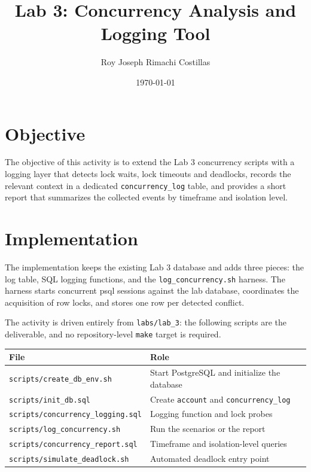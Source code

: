 \documentclass[11pt]{article}
\title{Lab 3\@: Concurrency Analysis and Logging Tool}
\author{Roy Joseph Rimachi Costillas}
\date{\today}
\begin{document}
\maketitle

\section{Objective}

The objective of this activity is to extend the Lab 3 concurrency scripts with a
logging layer that detects lock waits, lock timeouts and deadlocks, records the
relevant context in a dedicated \texttt{concurrency\_log} table, and provides a
short report that summarizes the collected events by timeframe and isolation
level.

\section{Implementation}

The implementation keeps the existing Lab 3 database and adds three pieces:
the log table, SQL logging functions, and the
\texttt{log\_concurrency.sh} harness. The harness starts concurrent psql
sessions against the lab database, coordinates the acquisition of row locks,
and stores one row per detected conflict.

The activity is driven entirely from \texttt{labs/lab\_3}: the following
scripts are the deliverable, and no repository-level \texttt{make} target is
required.

\begin{center}
\begin{tabular}{ll}
\hline
File & Role \\
\hline
\texttt{scripts/create\_db\_env.sh} & Start PostgreSQL and initialize the database \\
\texttt{scripts/init\_db.sql} & Create \texttt{account} and \texttt{concurrency\_log} \\
\texttt{scripts/concurrency\_logging.sql} & Logging function and lock probes \\
\texttt{scripts/log\_concurrency.sh} & Run the scenarios or the report \\
\texttt{scripts/concurrency\_report.sql} & Timeframe and isolation-level queries \\
\texttt{scripts/simulate\_deadlock.sh} & Automated deadlock entry point \\
\hline
\end{tabular}
\end{center}
\end{document}

